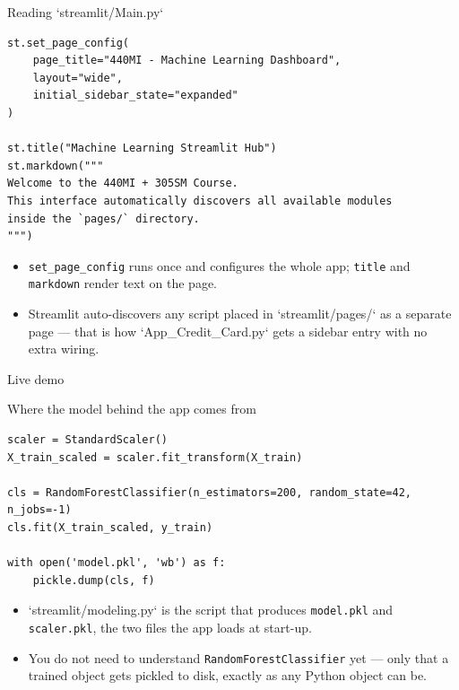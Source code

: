 \begin{frame}[fragile]{Reading `streamlit/Main.py`}
\begin{lstlisting}[style=coursepython]
st.set_page_config(
    page_title="440MI - Machine Learning Dashboard",
    layout="wide",
    initial_sidebar_state="expanded"
)

st.title("Machine Learning Streamlit Hub")
st.markdown("""
Welcome to the 440MI + 305SM Course.
This interface automatically discovers all available modules
inside the `pages/` directory.
""")
\end{lstlisting}
\begin{itemize}
\item \texttt{set\_page\_config} runs once and configures the whole app; \texttt{title} and \texttt{markdown} render text on the page.
\item Streamlit auto-discovers any script placed in `streamlit/pages/` as a separate page --- that is how `App_Credit_Card.py` gets a sidebar entry with no extra wiring.
\end{itemize}
\coursefooter
\end{frame}

\begin{frame}{Live demo}
\coursefooter
\end{frame}

\begin{frame}[fragile]{Where the model behind the app comes from}
\begin{lstlisting}[style=coursepython]
scaler = StandardScaler()
X_train_scaled = scaler.fit_transform(X_train)

cls = RandomForestClassifier(n_estimators=200, random_state=42, n_jobs=-1)
cls.fit(X_train_scaled, y_train)

with open('model.pkl', 'wb') as f:
    pickle.dump(cls, f)
\end{lstlisting}
\begin{itemize}
\item `streamlit/modeling.py` is the script that produces \texttt{model.pkl} and \texttt{scaler.pkl}, the two files the app loads at start-up.
\item You do not need to understand \texttt{RandomForestClassifier} yet --- only that a trained object gets pickled to disk, exactly as any Python object can be.
\end{itemize}
\coursefooter
\end{frame}

